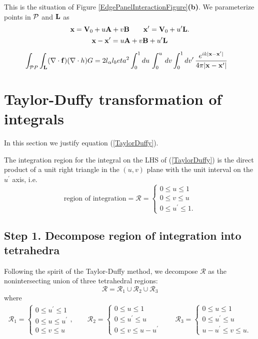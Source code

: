 \documentclass[letterpaper]{article}
\begin{document}
This is the situation of 
Figure \ref{EdgePanelInteractionFigure}\textbf{(b)}.
We parameterize points in $\mathcal{P}$ and $\mathbf{L}$ as 
$$ \mathbf{x} = \mathbf{V}_0 + u\mathbf{A} + v\mathbf{B}
   \qquad
   \mathbf{x}^\prime = \mathbf{V}_0 + u^\prime \mathbf{L}.
$$
$$ \mathbf{x} - \mathbf{x}^\prime = u\mathbf{A} + v\mathbf{B} + u^\prime \mathbf{L}$$

\begin{align*}
  \int_{\mathcal{P}{P}}\int_{\mathbf{L}} (\nabla \cdot \mathbf{f}) (\nabla \cdot h) G 
&=
  2l_\alpha l_beta^2 
  \int_0^1 du \, \int_0^u \, dv \int_0^1 dv^\prime \,
  \frac{e^{ik|\mathbf{x} - \mathbf{x}^\prime|}}{4\pi |\mathbf{x}- \mathbf{x}^\prime|}
\end{align*}

\appendix

\newpage
\section{Taylor-Duffy transformation of integrals}

In this section we justify equation 
(\ref{TaylorDuffy}).

The integration region for the integral on the LHS of 
(\ref{TaylorDuffy}) is the direct product of a unit
right triangle in the $(u,v)$ plane with the unit 
interval on the $u^\prime$ axis, i.e. 
$$\text{region of integration}=\mathcal{R}=
  \begin{cases}
  0\le u \le 1 \\
  0\le v \le u \\
  0\le u^\prime \le 1.
  \end{cases}
$$

\subsection*{Step 1. Decompose region of integration into tetrahedra}

Following the spirit of the Taylor-Duffy method, we 
decompose $\mathcal{R}$ as the nonintersecting union 
of three tetrahedral regions:
$$ \mathcal{R} = \mathcal{R}_1 \cup
                 \mathcal{R}_2 \cup
                 \mathcal{R}_3
$$
where 
\begin{align*}
  \mathcal{R}_1 = 
  \begin{cases}
  0 \le u^\prime \le 1 \\
  0 \le u \le u^\prime \\
  0 \le v \le u
  \end{cases},
\qquad
  \mathcal{R}_2 = 
  \begin{cases}
  0 \le u \le 1 \\
  0 \le u^\prime \le u \\
  0 \le v \le u-u^\prime
  \end{cases}
\qquad
  \mathcal{R}_3 = 
  \begin{cases}
  0 \le u \le 1 \\
  0 \le u^\prime \le u \\
  u-u^\prime \le v \le u.
  \end{cases}
\end{align*}
\end{document}
